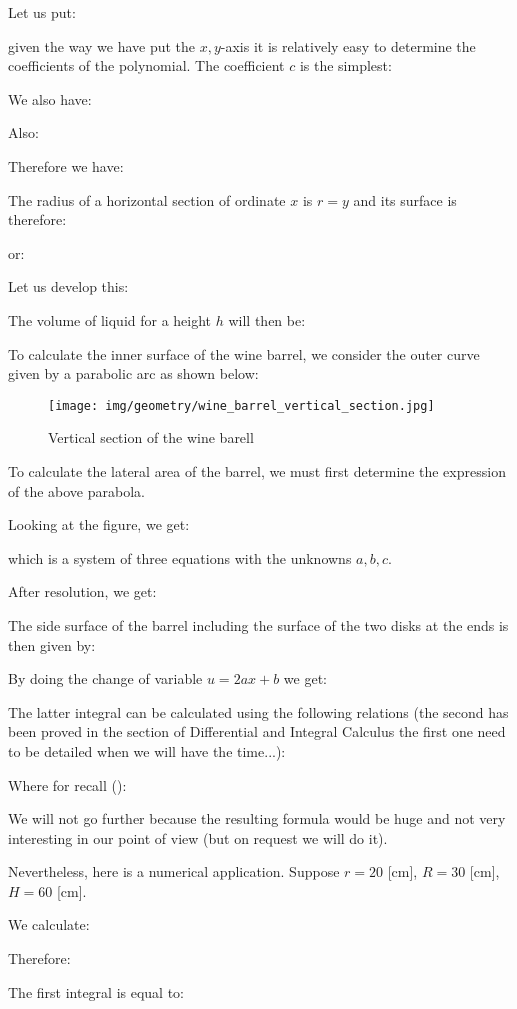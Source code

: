 {	Let us put:
	
	given the way we have put the $x, y$-axis it is relatively easy to determine the coefficients of the polynomial. The coefficient $c$ is the simplest:
	
	We also have:
	
	Also:
	
	Therefore we have:
	
	The radius of a horizontal section of ordinate $x$ is $r=y$ and its surface is therefore:
	
	or:
	
	Let us develop this:
	
	The volume of liquid for a height $h$ will then be:
	
	To calculate the inner surface of the wine barrel, we consider the outer curve given by a parabolic arc as shown below:
	\begin{figure}[H]
		\centering
		\texttt{[image: img/geometry/wine\_barrel\_vertical\_section.jpg]}
		\caption[]{Vertical section of the wine barell}
	\end{figure}
	To calculate the lateral area of the barrel, we must first determine the expression of the above parabola.
	
	Looking at the figure, we get:
	
	which is a system of three equations with the unknowns $a,b,c$.
	
	After resolution, we get:
	
	The side surface of the barrel including the surface of the two disks at the ends is then given by:
	
	By doing the change of variable $u=2ax+b$ we get:
	
	The latter integral can be calculated using the following relations (the second has been proved in the section of Differential and Integral Calculus the first one need to be detailed when we will have the time...):
	
	Where for recall ():
	
	We will not go further because the resulting formula would be huge and not very interesting in our point of view (but on request we will do it).	
	
	Nevertheless, here is a numerical application. Suppose $r=20$ [cm], $R=30$ [cm], $H=60$ [cm].
	
	We calculate:
	
	Therefore:
	
	The first integral is equal to:
	
}
